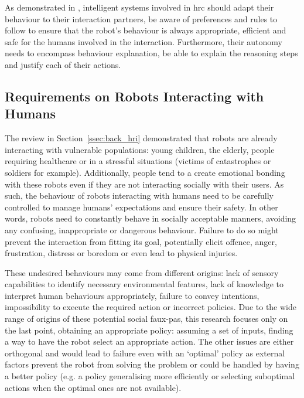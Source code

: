 	As demonstrated in \cite{munzer2017efficient}, intelligent systems involved in \gls{hrc} should adapt their behaviour to their interaction partners, be aware of preferences and rules to follow to ensure that the robot's behaviour is always appropriate, efficient and safe for the humans involved in the interaction. Furthermore, their autonomy needs to encompass behaviour explanation, be able to explain the reasoning steps and justify each of their actions.

\subsection{Requirements on Robots Interacting with Humans} \label{ssec:back_constraints}
    The review in Section~\ref{ssec:back_hri} demonstrated that robots are already interacting with vulnerable populations: young children, the elderly, people requiring healthcare or in a stressful situations (victims of catastrophes or soldiers for example). Additionally, people tend to a create emotional bonding with these robots even if they are not interacting socially with their users. As such, the behaviour of robots interacting with humans need to be carefully controlled to manage humans' expectations and ensure their safety. In other words, robots need to constantly behave in socially acceptable manners, avoiding any confusing, inappropriate or dangerous behaviour. Failure to do so might prevent the interaction from fitting its goal, potentially elicit offence, anger, frustration, distress or boredom or even lead to physical injuries. 
    
    These undesired behaviours may come from different origins: lack of sensory capabilities to identify necessary environmental features, lack of knowledge to interpret human behaviours appropriately, failure to convey intentions, impossibility to execute the required action or incorrect policies. Due to the wide range of origins of these potential social faux-pas, this research focuses only on the last point, obtaining an appropriate policy: assuming a set of inputs, finding a way to have the robot select an appropriate action. The other issues are either orthogonal and would lead to failure even with an `optimal' policy as external factors prevent the robot from solving the problem or could be handled by having a better policy (e.g. a policy generalising more efficiently or selecting suboptimal actions when the optimal ones are not available).%
    
